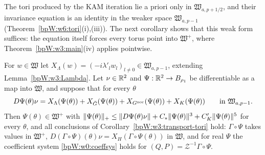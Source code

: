 The tori produced by the KAM iteration lie a priori only in $\mathfrak W_{a,p+1/2}$, and their invariance equation is an
identity in the weaker space $\mathfrak W_{a,p-1}$ (Theorem~\ref{bpW:w6:tori}(i),(iii)). The next corollary shows that
this weak form suffices: the equation itself forces every torus point into $\mathfrak W^+$, where
Theorem~\ref{bpW:w3:main}(iv) applies pointwise.

\begin{corollary}\label{bpW:w3:transport-tori-weak}
For $w\in\mathfrak W$ let $X_\Lambda(w)=(-i\lambda'_lw_l)_{l\ne0}\in\mathfrak W_{a,p-1}$, extending
Lemma~\ref{bpW:w3:Lambda}. Let $\nu\in\mathbb{R}^2$ and $\Psi:\mathbb{R}^2\to B_{\rho_1}$ be differentiable as a map into
$\mathfrak W$, and suppose that for every $\theta$
\[D\Psi(\theta)\nu=X_\Lambda(\Psi(\theta))+X_{\bar G}(\Psi(\theta))+X_{G^{\rm nor}}(\Psi(\theta))+X_K(\Psi(\theta))
\qquad\text{in }\mathfrak W_{a,p-1}.\]
Then $\Psi(\theta)\in\mathfrak W^+$ with $\lVert \Psi(\theta)\rVert_+\le\lVert D\Psi(\theta)\nu\rVert+C_*\lVert \Psi(\theta)\rVert^3+
C'_K\lVert \Psi(\theta)\rVert^5$ for every $\theta$, and all conclusions of Corollary~\ref{bpW:w3:transport-tori} hold:
$\Gamma\circ\Psi$ takes values in $\mathfrak W^+$, $D(\Gamma\circ\Psi)(\theta)\nu=X_H(\Gamma\circ\Psi(\theta))$ in
$\mathfrak W$, and for real $\Psi$ the coefficient system \eqref{bpW:w0:coeffsys} holds for
$(Q,P)=\mathcal Z^{-1}\Gamma\circ\Psi$.
\end{corollary}

